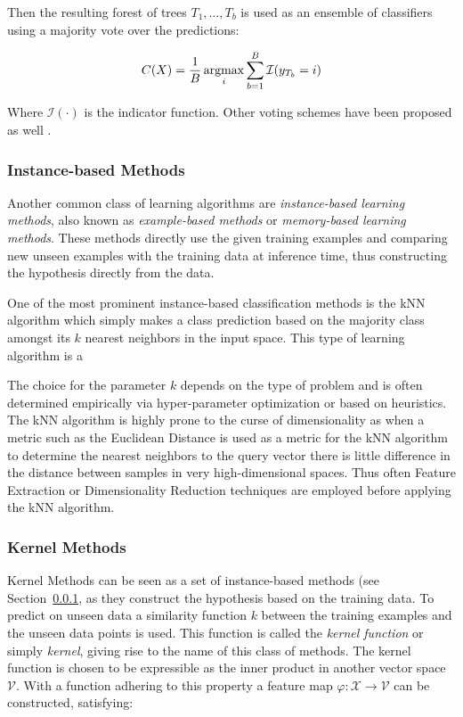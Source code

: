 Then the resulting forest of trees ${T_1, \ldots, T_b}$ is used as an ensemble of classifiers using a majority vote over the predictions:

\begin{equation}
  C(X) = \frac{1}{B} \argmax_i \sum_{b = 1}^B \mathcal{I}(y_{T_b} = i)
\end{equation}

Where $\mathcal{I}(\cdot)$ is the indicator function. Other voting schemes have been proposed as well .

\subsubsection{Instance-based Methods}
\label{subs:Instance-based Methods}

Another common class of learning algorithms are \emph{instance-based learning methods}, also known as \emph{example-based methods} or \emph{memory-based learning methods}. These methods directly use the given training examples and comparing new unseen examples with the training data at inference time, thus constructing the hypothesis directly from the data.

One of the most prominent instance-based classification methods is the \gls{kNN} algorithm which simply makes a class prediction based on the majority class amongst its $k$ nearest neighbors in the input space. This type of learning algorithm is a

The choice for the parameter $k$ depends on the type of problem and is often determined empirically via hyper-parameter optimization or based on heuristics. The \gls{kNN} algorithm is highly prone to the curse of dimensionality as when a metric such as the Euclidean Distance is used as a metric for the \gls{kNN} algorithm to determine the nearest neighbors to the query vector there is little difference in the distance between samples in very high-dimensional spaces. Thus often \gls{Feature Extraction} or \gls{Dimensionality Reduction} techniques are employed before applying the \gls{kNN} algorithm.

\subsubsection{Kernel Methods}
\label{subs:Kernel Methods}


Kernel Methods can be seen as a set of instance-based methods (see Section~\ref{subs:Instance-based Methods}, as they construct the hypothesis based on the training data. To predict on unseen data a similarity function $k$ between the training examples and the unseen data points is used. This function is called the \emph{kernel function} or simply \emph{kernel}, giving rise to the name of this class of methods. The kernel function is chosen to be expressible as the inner product in another vector space $\mathcal{V}$. With a function adhering to this property a feature map $\varphi \colon {\mathcal {X}}\to {\mathcal {V}}$ can be constructed, satisfying:

